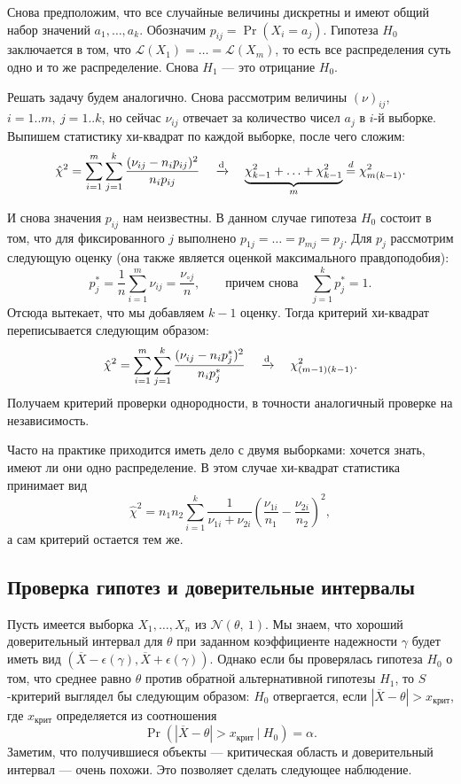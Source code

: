 Снова предположим, что все случайные величины дискретны и имеют общий
набор значений $a_1, \ldots, a_k$. Обозначим $p_{ij} = \Pr(X_i = a_j)$.
Гипотеза $H_0$ заключается в том, что $\mathcal{L}(X_1) = \ldots =
\mathcal{L}(X_m)$, то есть все распределения суть одно и то же распределение.
Снова $H_1$ --- это отрицание $H_0$.

Решать задачу будем аналогично. Снова рассмотрим величины $(\nu)_{ij}$,
$i = 1..m,\ j = 1..k$, но сейчас $\nu_{ij}$ отвечает за количество чисел
$a_j$ в $i$-й выборке. Выпишем статистику хи-квадрат по каждой выборке,
после чего сложим:
\[
    \hat{\chi}^2 = \sum_{i=1}^m \sum_{j=1}^k \frac{(\nu_{ij} -
    n_ip_{ij})^2}{n_ip_{ij}} \quad \xrightarrow{\mathrm{d}} \quad \underbrace{\chi^2_{k-1}
    + \ldots + \chi^2_{k-1}}_{m} \overset{d}{=} \chi^2_{m(k-1)}.
    \]

И снова значения $p_{ij}$ нам неизвестны. В данном случае гипотеза $H_0$
состоит в том, что для фиксированного $j$ выполнено $p_{1j} = \ldots =
p_{mj} = p_j$. Для $p_j$ рассмотрим следующую оценку (она также является
оценкой максимального правдоподобия):
\[
    p_j^* = \frac1n \sum_{i=1}^m \nu_{ij} = \frac{\nu_{\circ j}}n, \qquad
    \text{причем снова} \quad \sum_{j=1}^k p_j^* = 1.
    \]
Отсюда вытекает, что мы добавляем $k-1$ оценку. Тогда критерий хи-квадрат
переписывается следующим образом:
\[
    \hat{\chi}^2 = \sum_{i=1}^m \sum_{j=1}^k \frac{(\nu_{ij} -
    n_ip_j^*)^2}{n_ip_j^*} \quad \xrightarrow{\mathrm{d}} \quad \chi^2_{(m-1)(k-1)}.
    \]
Получаем критерий проверки однородности, в точности аналогичный проверке
на независимость.

\begin{example}
    Часто на практике приходится иметь дело с двумя выборками: хочется
    знать, имеют ли они одно распределение. В этом случае хи-квадрат
    статистика принимает вид
    \[
        \hat{\chi}^2 = n_1n_2 \sum_{i=1}^k \frac1{\nu_{1i} + \nu_{2i}}
        \left( \frac{\nu_{1i}}{n_1} - \frac{\nu_{2i}}{n_2} \right)^2,
        \]
    а сам критерий остается тем же.
\end{example}

\subsection{Проверка гипотез и доверительные интервалы}
Пусть имеется выборка $X_1, \ldots, X_n$ из $\mathcal{N}(\theta,\ 1)$.
Мы знаем, что хороший доверительный интервал для $\theta$ при заданном
коэффициенте надежности $\gamma$ будет иметь вид $(\overline{X} -
\epsilon(\gamma), \overline{X} + \epsilon(\gamma))$. Однако если бы
проверялась гипотеза $H_0$ о том, что среднее равно $\theta$ против
обратной альтернативной гипотезы $H_1$, то $S$-критерий выглядел бы
следующим образом: $H_0$ отвергается, если $|\overline{X} - \theta|
> x_{\text{крит}}$, где $x_{\text{крит}}$ определяется из соотношения
\[
    \Pr(|\overline{X} - \theta| > x_{\text{крит}}\ |\ H_0) = \alpha.
    \]
Заметим, что получившиеся объекты --- критическая область и доверительный
интервал --- очень похожи. Это позволяет сделать следующее наблюдение.

